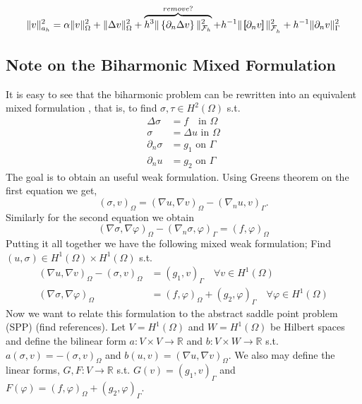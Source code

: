 \begin{equation*}
\|v\|_{a_{h}} ^{2}  = \alpha  \|v\|_{  \Omega  }^2 + \|\Delta v\|_{ \Omega  }^2 + \overbrace{h^3   \| \left\{\partial_n \Delta v\right\} \| _{\mathcal{F}_{h}   }^2 }^{ remove?}
+ h^{-1} \| \left[\!\!\left[  \partial_n v  \right]\!\!\right] \|_{ \mathcal{F}_{h}^{}    }^{2} + h^{-1} \|  \partial_n v  \|_{ \Gamma    }^{2}
\end{equation*}


\subsection{Note on the Biharmonic Mixed Formulation}%
\label{subsec:biharmonic_mixed_formulation}

It is easy to see that the biharmonic problem can be rewritten into an equivalent mixed formulation , that is, to find $\sigma, \tau  \in H^2( \Omega ) $ s.t. \[
    \begin{split}
\Delta \sigma  & = f \quad  \text{in } \Omega \\
\sigma   & = \Delta u  \text{ in } \Omega \\
\partial _{n} \sigma  & = g_{1} \text{ on } \Gamma  \\
\partial _{n} u   & = g_{2} \text{ on } \Gamma
    \end{split}
\]
The goal is to obtain an useful weak formulation. Using Greens theorem on the first equation we get,
\[
( \sigma, v)_{\Omega } = ( \nabla  u , \nabla v  )_{\Omega } - ( \nabla _{n} u , v) _{\Gamma }.
\]
Similarly for the second equation we obtain
\[
( \nabla \sigma , \nabla \varphi  )_{\Omega} - ( \nabla _{n} \sigma ,  \varphi )_{\Gamma } = ( f,\varphi ) _{\Omega}
\]
Putting it all together we have the following mixed weak formulation; Find $( u, \sigma ) \in H^{1}( \Omega ) \times H^{1}( \Omega )  $ s.t. \[
    \begin{split}
     ( \nabla  u , \nabla v  )_{\Omega } -( \sigma, v)_{\Omega }  & =   ( g_{1} , v) _{\Gamma } \quad  \forall v \in H^{1}( \Omega ) \\
( \nabla \sigma , \nabla \varphi  )_{\Omega}  & = ( f,\varphi ) _{\Omega} + ( g_{2} ,  \varphi )_{\Gamma } \quad  \forall \varphi \in H^{1}( \Omega )
    \end{split}
\]
Now we want to relate this formulation to the abstract saddle point problem (SPP) (find references).
Let $V = H^{1}( \Omega ) $  and $W=H^{1}( \Omega ) $ be  Hilbert spaces and define the bilinear form $a: V\times V \to \mathbb{R}  $ and $b: V \times W \to \mathbb{R} $ s.t. $a( \sigma,v ) = - ( \sigma , v) _{\Omega }  $ and $b( u,v) = ( \nabla u,
\nabla v)_{\Omega  }  $. We also may define the linear forms, $G,F: V \to \mathbb{R} $ s.t. $ G( v)  = ( g_{1}, v) _{\Gamma } $ and $F( \varphi ) = ( f, \varphi )_{\Omega } + ( g_{2}, \varphi )_{\Gamma } $.

